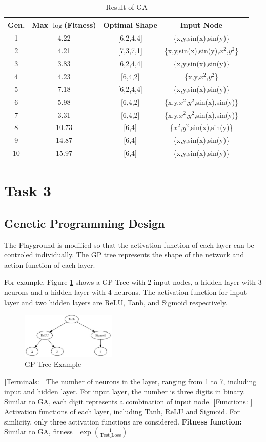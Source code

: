 \documentclass[12pt]{article}
\begin{document}
\begin{table}[!ht]
\centering
\begin{tabular}{ccccc}
\toprule
Gen.  & Max $\log$(Fitness) & Optimal Shape & Input Node  \\ \midrule
1 & 4.22 & [6,2,4,4]&\{x,y,sin(x),sin(y)\}  \\
2 & 4.21 & [7,3,7,1]&\{x,y,sin(x),sin(y),$x^2$,$y^2$\}   \\
3 & 3.83 & [6,2,4,4]&\{x,y,sin(x),sin(y)\}   \\
4 & 4.23 & [6,4,2]&\{x,y,$x^2$,$y^2$\}    \\
5 & 7.18 & [6,2,4,4]&\{x,y,sin(x),sin(y)\}   \\
6 & 5.98 & [6,4,2]&\{x,y,$x^2$,$y^2$,sin(x),sin(y)\}    \\
7 & 3.31 & [6,4,2]&\{x,y,$x^2$,$y^2$,sin(x),sin(y)\}   \\
8 & 10.73 & [6,4]&\{$x^2$,$y^2$,sin(x),sin(y)\}    \\
9 & 14.87 & [6,4]&\{x,y,sin(x),sin(y)\}     \\
10 & 15.97 & [6,4]&\{x,y,sin(x),sin(y)\}    \\
\bottomrule
\end{tabular}
\caption{Result of GA}
\label{t_res}

\end{table}
\newpage
\section{Task 3}
\subsection{Genetic Programming Design}
The Playground is modified so that the activation function of each layer can be controled individually.
The GP tree represents the shape of the network and action function of each layer.

For example, Figure \ref{gptree} shows a GP Tree with 2 input nodes, a hidden layer with 3 neurons and a hidden layer with 4 neurons. The activation function for input layer and two hidden layers are ReLU, Tanh, and Sigmoid respectively.
\begin{figure}
\centering
    \includegraphics[width=0.4\textwidth]{GPTree.jpg}
    \caption{GP Tree Example}
    \label{gptree}
\end{figure}
\textbf[Terminals: ]
The number of neurons in the layer, ranging from 1 to 7, including input and hidden layer. For input layer, the number is three digits in binary. Similar to GA, each digit represents a combination of input node.
\textbf[Functions: ]
Activation functions of each layer, including Tanh, ReLU and Sigmoid. For simlicity, only three activation functions are considered.
\textbf{Fitness function: } Similar to GA, fitness=$\exp(\frac1{\text{Test\_Loss}})$
\end{document}

